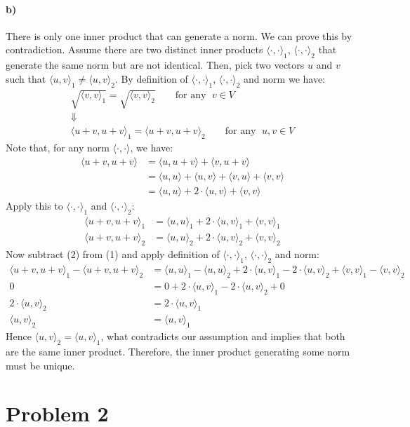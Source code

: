 \documentclass[10pt,letter]{article}
\newcommand{\inner}{\langle\cdot,\cdot\rangle}
\newcommand{\inr}[2]{\langle #1, #2\rangle}
\begin{document}
\paragraph{b)} There is only one inner product that can generate a norm. We can prove this by contradiction. Assume there are two distinct inner products $\inner_1$, $\inner_2$ that generate the same norm but are not identical. Then, pick two vectors $u$ and $v$ such that $\inr{u}{v}_1 \neq \inr{u}{v}_2$. By definition of $\inner_1$, $\inner_2$ and norm we have:
\begin{gather*}
\sqrt{\inr{v}{v}_1} = \sqrt{\inr{v}{v}_2} \qquad \textrm{for any } \; v \in V
\\
\Downarrow
\\
\inr{u+v}{u+v}_1 = \inr{u+v}{u+v}_2 \qquad \textrm{for any } \; u,v \in V
\end{gather*}
Note that, for any norm $\inner$, we have:
\begin{align*}
\inr{u+v}{u+v} &= \inr{u}{u+v} + \inr{v}{u+v}
\\ & = \inr{u}{u} + \inr{u}{v} + \inr{v}{u} + \inr{v}{v}
\\ & = \inr{u}{u} + 2\cdot\inr{u}{v} + \inr{v}{v}
\end{align*}
Apply this to $\inner_1$ and $\inner_2$:
\begin{align}
\inr{u+v}{u+v}_1 &= \inr{u}{u}_1 + 2\cdot\inr{u}{v}_1 + \inr{v}{v}_1
\\
\inr{u+v}{u+v}_2 &= \inr{u}{u}_2 + 2\cdot\inr{u}{v}_2 + \inr{v}{v}_2
\end{align}
Now subtract (2) from (1) and apply definition of $\inner_1$, $\inner_2$ and norm:
\begin{align*}
\inr{u+v}{u+v}_1 - \inr{u+v}{u+v}_2 &= \inr{u}{u}_1 - \inr{u}{u}_2 + 2\cdot\inr{u}{v}_1 - 2\cdot\inr{u}{v}_2 + \inr{v}{v}_1 - \inr{v}{v}_2
\\
0 &= 0 + 2\cdot\inr{u}{v}_1 - 2\cdot\inr{u}{v}_2 + 0
\\
2\cdot\inr{u}{v}_2 &= 2\cdot\inr{u}{v}_1
\\
\inr{u}{v}_2 &= \inr{u}{v}_1
\end{align*}
Hence $\inr{u}{v}_2 = \inr{u}{v}_1$, what contradicts our assumption and implies that both are the same inner product. Therefore, the inner product generating some norm must be unique.

\pagebreak

\section*{Problem 2}
\end{document}
